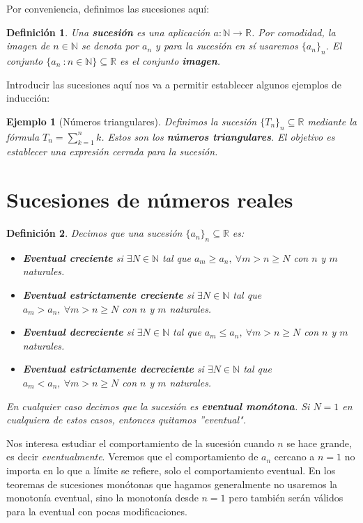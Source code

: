 \documentclass{article}
\newtheorem{define}{Definición}
\newtheorem{ejem}{Ejemplo}
\newcommand{\reales}{\mathbb{R}}
\newcommand{\sucreal}[1]{\{ #1 _n \}_n \subseteq \reales}
\begin{document}
Por conveniencia, definimos las sucesiones aquí:
\begin{define}
	Una \textbf{sucesión} es una aplicación $a: \mathbb{N} \rightarrow \mathbb{R}$. Por comodidad, la imagen de $n \in \mathbb{N}$ se denota por $a_n$ y para la sucesión en sí usaremos $\{a_n\}_n$. El conjunto $\{a_n\ : n \in \mathbb{N}\} \subseteq \mathbb{R}$ es el conjunto \textbf{imagen}. 
\end{define}
Introducir las sucesiones aquí nos va a permitir establecer algunos ejemplos de inducción:
\begin{ejem}[Números triangulares]
	Definimos la sucesión $\sucreal{T}$ mediante la fórmula $T_n = \sum_{k = 1}^{n} k$. Estos son los \textbf{números triangulares}. El objetivo es establecer una expresión cerrada para la sucesión.
\end{ejem}








\newpage
\section{Sucesiones de números reales}
\begin{define}Decimos que una sucesión $\{a_n\}_n \subseteq \mathbb{R}$ es:
	\begin{itemize}
		\item
		\textbf{Eventual creciente} si $\exists N \in \mathbb{N}$ tal que $a_m \geq a_n,\ \forall m>n\geq N$ con $n$ y $m$ naturales.
		\item
		\textbf{Eventual estrictamente creciente} si $\exists N \in \mathbb{N}$ tal que $a_m > a_n,\ \forall m>n\geq N$ con $n$ y $m$ naturales.
		\item
		\textbf{Eventual decreciente} si $\exists N \in \mathbb{N}$ tal que $a_m \leq a_n,\ \forall m>n\geq N$ con $n$ y $m$ naturales.
		\item
		\textbf{Eventual estrictamente decreciente} si $\exists N \in \mathbb{N}$ tal que $a_m < a_n,\ \forall m>n\geq N$ con $n$ y $m$ naturales.
	\end{itemize}
	En cualquier caso decimos que la sucesión es \textbf{eventual monótona}. Si $N = 1$ en cualquiera de estos casos, entonces quitamos ''eventual".
\end{define}
Nos interesa estudiar el comportamiento de la sucesión cuando $n$ se hace grande, es decir \textit{eventualmente}. Veremos que el comportamiento de $a_n$ cercano a $n = 1$ no importa
en lo que a límite se refiere, solo el comportamiento eventual. En los teoremas de sucesiones monótonas que hagamos generalmente no usaremos la monotonía eventual, sino la monotonía desde $n = 1$ pero también serán válidos para la eventual con pocas modificaciones.
\end{document}
